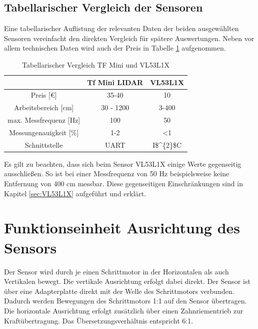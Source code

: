 \subsection{Tabellarischer Vergleich der Sensoren}
Eine tabellarischer Auflistung der relevanten Daten der beiden ausgewählten Sensoren vereinfacht den direkten Vergleich für spätere Auswertungen. Neben vor allem technischen Daten wird auch der Preis in Tabelle \ref{vergleich} aufgenommen.
\begin{table}[H]
	\centering
	\caption{Tabellarischer Vergleich TF Mini und VL53L1X}
	\begin{tabular}{|c|c|c|}
		\hline
		\textbf{} 				& \textbf{Tf Mini LIDAR}	& \textbf{VL53L1X} 	 \\ \hline
		Preis [€]				&  35-40					& 10			\\ \hline
		Arbeitsbereich [cm]		&  30 - 1200   				& 3-400			\\ \hline
		max. Messfrequenz [Hz]	&  100						& 50 			\\ \hline
		Messungenauigkeit [\%]	&  1-2 						& <1			\\ \hline
		Schnittstelle 			&  \ac{UART}				& \ac{I$^{2}$C}\\ \hline
 		
	\end {tabular}
	\label{vergleich}
\end{table}
Es gilt zu beachten, dass sich beim Sensor VL53L1X einige Werte gegenseitig ausschließen. So ist bei einer Messfrequenz von 50 Hz beispielsweise keine Entfernung von 400 cm messbar. Diese gegenseitigen Einschränkungen sind in Kapitel \ref{sec:VL53L1X} aufgeführt und erklärt.
\section{Funktionseinheit Ausrichtung des Sensors}
Der Sensor wird durch je einen Schrittmotor in der Horizontalen als auch Vertikalen bewegt. Die vertikale Ausrichtung erfolgt dabei direkt. Der Sensor ist über eine Adapterplatte direkt mit der Welle des Schrittmotors verbunden. Dadurch werden Bewegungen des Schrittmotors 1:1 auf den Sensor übertragen.\\ 
Die horizontale Ausrichtung erfolgt zusätzlich über einen Zahnriementrieb zur Kraftübertragung. Das Übersetzungsverhältnis entspricht 6:1.  
\newpage
